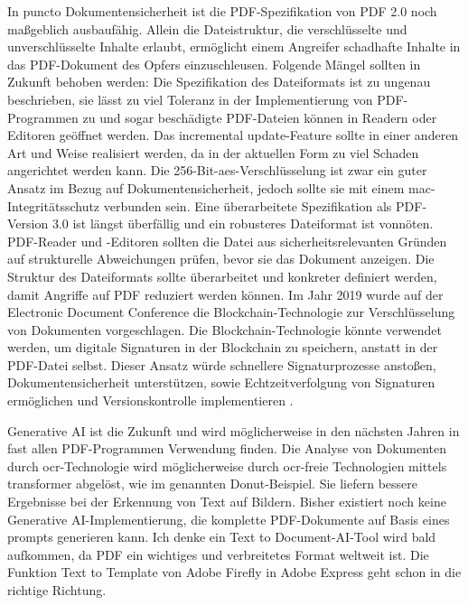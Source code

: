 In puncto Dokumentensicherheit ist die PDF-Spezifikation von PDF 2.0 noch maßgeblich ausbaufähig. Allein die Dateistruktur, die verschlüsselte und unverschlüsselte Inhalte erlaubt, ermöglicht einem Angreifer schadhafte Inhalte in das PDF-Dokument des Opfers einzuschleusen. Folgende Mängel sollten in Zukunft behoben werden: Die Spezifikation des Dateiformats ist zu ungenau beschrieben, sie lässt zu viel Toleranz in der Implementierung von PDF-Programmen zu und sogar beschädigte PDF-Dateien können in Readern oder Editoren geöffnet werden. Das incremental update-Feature sollte in einer anderen Art und Weise realisiert werden, da in der aktuellen Form zu viel Schaden angerichtet werden kann. Die 256-Bit-\gls{aes}-Verschlüsselung ist zwar ein guter Ansatz im Bezug auf Dokumentensicherheit, jedoch sollte sie mit einem \gls{mac}-Integritätsschutz verbunden sein. Eine überarbeitete Spezifikation als PDF-Version 3.0 ist längst überfällig und ein robusteres Dateiformat ist vonnöten. PDF-Reader und -Editoren sollten die Datei aus sicherheitsrelevanten Gründen auf strukturelle Abweichungen prüfen, bevor sie das Dokument anzeigen. Die Struktur des Dateiformats sollte überarbeitet und konkreter definiert werden, damit Angriffe auf PDF reduziert werden können. Im Jahr 2019 wurde auf der Electronic Document Conference die Blockchain-Technologie zur Verschlüsselung von Dokumenten vorgeschlagen. Die Blockchain-Technologie könnte verwendet werden, um digitale Signaturen in der Blockchain zu speichern, anstatt in der PDF-Datei selbst. Dieser Ansatz würde schnellere Signaturprozesse anstoßen, Dokumentensicherheit unterstützen, sowie Echtzeitverfolgung von Signaturen ermöglichen und Versionskontrolle implementieren \cite{pdf-association-blockchain}.
\par
Generative AI ist die Zukunft und wird möglicherweise in den nächsten Jahren in fast allen PDF-Programmen Verwendung finden. Die Analyse von Dokumenten durch \gls{ocr}-Technologie wird möglicherweise durch \gls{ocr}-freie Technologien mittels transformer abgelöst, wie im genannten Donut-Beispiel. Sie liefern bessere Ergebnisse bei der Erkennung von Text auf Bildern. Bisher existiert noch keine Generative AI-Implementierung, die komplette PDF-Dokumente auf Basis eines prompts generieren kann. Ich denke ein Text to Document-AI-Tool wird bald aufkommen, da PDF ein wichtiges und verbreitetes Format weltweit ist. Die Funktion Text to Template von Adobe Firefly in Adobe Express geht schon in die richtige Richtung. 